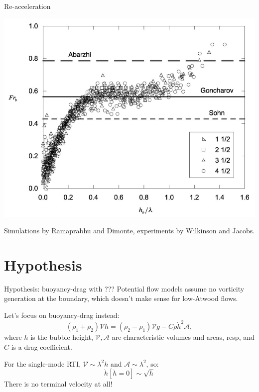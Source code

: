 \documentclass[12pt]{beamer}
\begin{document}
\begin{frame}[t]{Re-acceleration}
{\includegraphics[height=0.5\textheight]{graphics/wilkinson_Fr.png}

{\footnotesize Simulations by Ramaprabhu and Dimonte, experiments by Wilkinson and Jacobs.}
}
\end{frame}

\section{Hypothesis}

\begin{frame}{Hypothesis: buoyancy-drag with ???}
Potential flow models assume no vorticity generation at the boundary,
which doesn't make sense for low-Atwood flows.

\vspace{20pt} \pause
Let's focus on buoyancy-drag instead:
\begin{equation*}
(\rho_1 + \rho_2) \mathcal{V} \ddot{h} = (\rho_2 - \rho_1) \mathcal{V} g - C \rho \dot{h}^2 \mathcal{A},
\end{equation*}
where $h$ is the bubble height, $\mathcal{V}, \mathcal{A}$ are characteristic volumes and areas, resp, and $C$ is a drag coefficient.

\vspace{20pt} \pause
For the single-mode RTI, $\mathcal{V} \sim \lambda^2 h$ and $\mathcal{A} \sim \lambda^2$, so:
\begin{equation*}
\dot{h}\left[\ddot{h} = 0\right] \sim \sqrt{h}
\end{equation*}
There is no terminal velocity at all!

\end{frame}
\end{document}

